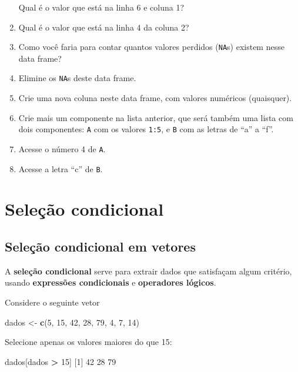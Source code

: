 \documentclass[10pt,a4paper]{book}
\newenvironment{Shaded}{\begin{snugshade}}{\end{snugshade}}
\newcommand{\KeywordTok}[1]{\textcolor[rgb]{0.13,0.29,0.53}{\textbf{#1}}}
\newcommand{\DecValTok}[1]{\textcolor[rgb]{0.00,0.00,0.81}{#1}}
\newcommand{\StringTok}[1]{\textcolor[rgb]{0.31,0.60,0.02}{#1}}
\newcommand{\OperatorTok}[1]{\textcolor[rgb]{0.81,0.36,0.00}{\textbf{#1}}}
\newcommand{\NormalTok}[1]{#1}
\begin{document}
\begin{enumerate}
  Qual é o valor que está na linha 6 e coluna 1?
\item
  Qual é o valor que está na linha 4 da coluna 2?
\item
  Como você faria para contar quantos valores perdidos (\texttt{NA}s)
  existem nesse data frame?
\item
  Elimine os \texttt{NA}s deste data frame.
\item
  Crie uma nova coluna neste data frame, com valores numéricos
  (quaisquer).
\item
  Crie mais um componente na lista anterior, que será também uma lista
  com dois componentes: \texttt{A} com os valores \texttt{1:5}, e
  \texttt{B} com as letras de ``a'' a ``f''.
\item
  Acesse o número 4 de \texttt{A}.
\item
  Acesse a letra ``c'' de \texttt{B}.
\end{enumerate}

\section{Seleção condicional}\label{seleuxe7uxe3o-condicional}

\subsection{Seleção condicional em
vetores}\label{seleuxe7uxe3o-condicional-em-vetores}

A \textbf{seleção condicional} serve para extrair dados que satisfaçam
algum critério, usando \textbf{expressões condicionais} e
\textbf{operadores lógicos}.

Considere o seguinte vetor

\begin{Shaded}
\begin{Highlighting}[]
\NormalTok{dados <-}\StringTok{ }\KeywordTok{c}\NormalTok{(}\DecValTok{5}\NormalTok{, }\DecValTok{15}\NormalTok{, }\DecValTok{42}\NormalTok{, }\DecValTok{28}\NormalTok{, }\DecValTok{79}\NormalTok{, }\DecValTok{4}\NormalTok{, }\DecValTok{7}\NormalTok{, }\DecValTok{14}\NormalTok{)}
\end{Highlighting}
\end{Shaded}

Selecione apenas os valores maiores do que 15:

\begin{Shaded}
\begin{Highlighting}[]
\NormalTok{dados[dados }\OperatorTok{>}\StringTok{ }\DecValTok{15}\NormalTok{]}
\NormalTok{[}\DecValTok{1}\NormalTok{] }\DecValTok{42} \DecValTok{28} \DecValTok{79}
\end{Highlighting}
\end{Shaded}
\end{document}

